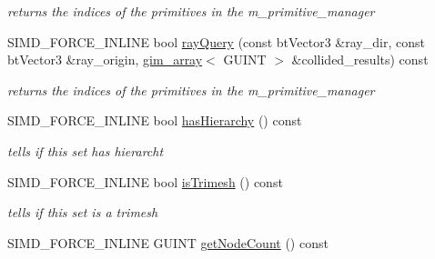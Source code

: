 \begin{DoxyCompactItemize}
\begin{DoxyCompactList}\small\item\em returns the indices of the primitives in the m\+\_\+primitive\+\_\+manager \end{DoxyCompactList}\item 
\hypertarget{class_g_i_m___b_o_x___t_r_e_e___t_e_m_p_l_a_t_e___s_e_t_a41bdfb53e019a173fbfb157029db11b4}{S\+I\+M\+D\+\_\+\+F\+O\+R\+C\+E\+\_\+\+I\+N\+L\+I\+N\+E bool \hyperlink{class_g_i_m___b_o_x___t_r_e_e___t_e_m_p_l_a_t_e___s_e_t_a41bdfb53e019a173fbfb157029db11b4}{ray\+Query} (const bt\+Vector3 \&ray\+\_\+dir, const bt\+Vector3 \&ray\+\_\+origin, \hyperlink{classgim__array}{gim\+\_\+array}$<$ G\+U\+I\+N\+T $>$ \&collided\+\_\+results) const }\label{class_g_i_m___b_o_x___t_r_e_e___t_e_m_p_l_a_t_e___s_e_t_a41bdfb53e019a173fbfb157029db11b4}

\begin{DoxyCompactList}\small\item\em returns the indices of the primitives in the m\+\_\+primitive\+\_\+manager \end{DoxyCompactList}\item 
\hypertarget{class_g_i_m___b_o_x___t_r_e_e___t_e_m_p_l_a_t_e___s_e_t_a4582ba1e2cee36d653aae235de9e2562}{S\+I\+M\+D\+\_\+\+F\+O\+R\+C\+E\+\_\+\+I\+N\+L\+I\+N\+E bool \hyperlink{class_g_i_m___b_o_x___t_r_e_e___t_e_m_p_l_a_t_e___s_e_t_a4582ba1e2cee36d653aae235de9e2562}{has\+Hierarchy} () const }\label{class_g_i_m___b_o_x___t_r_e_e___t_e_m_p_l_a_t_e___s_e_t_a4582ba1e2cee36d653aae235de9e2562}

\begin{DoxyCompactList}\small\item\em tells if this set has hierarcht \end{DoxyCompactList}\item 
\hypertarget{class_g_i_m___b_o_x___t_r_e_e___t_e_m_p_l_a_t_e___s_e_t_adb73fde6e00a979c38b2240b7b706a8d}{S\+I\+M\+D\+\_\+\+F\+O\+R\+C\+E\+\_\+\+I\+N\+L\+I\+N\+E bool \hyperlink{class_g_i_m___b_o_x___t_r_e_e___t_e_m_p_l_a_t_e___s_e_t_adb73fde6e00a979c38b2240b7b706a8d}{is\+Trimesh} () const }\label{class_g_i_m___b_o_x___t_r_e_e___t_e_m_p_l_a_t_e___s_e_t_adb73fde6e00a979c38b2240b7b706a8d}

\begin{DoxyCompactList}\small\item\em tells if this set is a trimesh \end{DoxyCompactList}\item 
\hypertarget{class_g_i_m___b_o_x___t_r_e_e___t_e_m_p_l_a_t_e___s_e_t_ad46fb05b667c4f79c9d599dfb04d5566}{S\+I\+M\+D\+\_\+\+F\+O\+R\+C\+E\+\_\+\+I\+N\+L\+I\+N\+E G\+U\+I\+N\+T \hyperlink{class_g_i_m___b_o_x___t_r_e_e___t_e_m_p_l_a_t_e___s_e_t_ad46fb05b667c4f79c9d599dfb04d5566}{get\+Node\+Count} () const }\label{class_g_i_m___b_o_x___t_r_e_e___t_e_m_p_l_a_t_e___s_e_t_ad46fb05b667c4f79c9d599dfb04d5566}


\end{DoxyCompactItemize}
